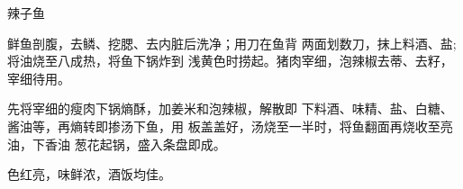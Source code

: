 \begin{recipe}{辣子鱼}

\ingredients



\cooking

\step 	鲜鱼剖腹，去鳞、挖腮、去内脏后洗净；用刀在鱼背 两面划数刀，抹上料酒、盐;将油烧至八成热，将鱼下锅炸到 浅黄色时捞起。猪肉宰细，泡辣椒去蒂、去籽，宰细待用。

\step 	先将宰细的瘦肉下锅熵酥，加姜米和泡辣椒，解散即 下料酒、味精、盐、白糖、酱油等，再熵转即掺汤下鱼，用 板盖盖好，汤烧至一半时，将鱼翻面再烧收至亮油，下香油 葱花起锅，盛入条盘即成。

\notes

色红亮，味鲜浓，酒饭均佳。

\end{recipe}

